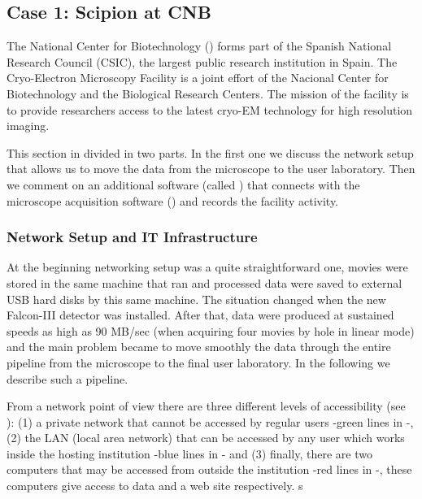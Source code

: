 \subsection{Case 1: Scipion at CNB}
The National Center for Biotechnology (\cnb) forms part of the Spanish National Research Council (CSIC), the largest public research institution in Spain. 
The \cnb Cryo-Electron Microscopy Facility is a joint effort of the Nacional Center for Biotechnology and the Biological Research Centers. The mission of the facility is to provide researchers access to the latest cryo-EM technology for high resolution imaging. 

This section in divided in two parts. In the first one we discuss the network setup that allows us to move the data from the microscope to the user laboratory. Then  we comment on an additional software (called  \emadmin) that connects \scipion with the microscope acquisition software (\epu) and records the facility activity.

\subsubsection{Network Setup and IT Infrastructure}

At the beginning \cnb networking setup was a quite straightforward one, movies were stored in the same machine that ran \scipion and processed data were saved to external USB hard disks by this same machine. The situation changed when the new Falcon-III detector was installed. After that, data were produced at sustained speeds as high as 90 MB/sec (when acquiring four movies by hole in linear mode) and the main problem became to move smoothly the data through the entire pipeline from the microscope to the final user laboratory. In the following we describe such a pipeline.

From a network point of view there are three different levels of accessibility (see  ): (1) a private network that cannot be accessed by regular users -green lines in -, (2) the \cnb LAN (local area network)  that can be accessed by any user which works inside the hosting  institution -blue lines in - and (3) finally, there are two computers that may be accessed from outside the institution -red lines in -, these computers give access to data and a web site respectively. s

